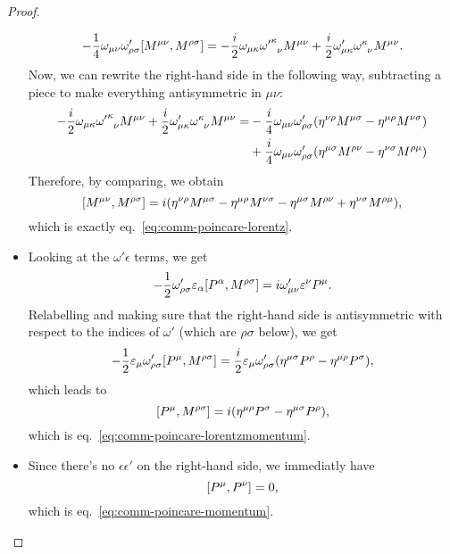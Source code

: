 \begin{mdframed}
\begin{proof}
\begin{itemize}
    \begin{align*}
       - \frac{1}{4} \omega_{\mu\nu} \omega'_{\rho\sigma} \comm{M^{\mu\nu}}{M^{\rho\sigma}} = -\frac{i}{2} \omega_{\mu\kappa} \tensor{{\omega'}}{^\kappa_\nu} M^{\mu\nu} + \frac{i}{2} \omega'_{\mu\kappa} \tensor{\omega}{^\kappa_\nu} M^{\mu\nu} .
    \end{align*}
    Now, we can rewrite the right-hand side in the following way, subtracting a piece to make everything antisymmetric in $\mu\nu$:
    \begin{align*}
        -\frac{i}{2} \omega_{\mu\kappa} \tensor{{\omega'}}{^\kappa_\nu} M^{\mu\nu} + \frac{i}{2} \omega'_{\mu\kappa} \tensor{\omega}{^\kappa_\nu} M^{\mu\nu} = &-\frac{i}{4} \omega_{\mu\nu} \omega'_{\rho\sigma}( \eta^{\nu\rho}M^{\mu\sigma} - \eta^{\mu\rho}M^{\nu\sigma} ) \\
        &+ \frac{i}{4} \omega_{\mu\nu}\omega'_{\rho\sigma} ( \eta^{\mu\sigma}M^{\rho\nu} -\eta^{\nu\sigma}M^{\rho\mu})
    \end{align*}
    Therefore, by comparing, we obtain
    \begin{equation*}
        \comm{M^{\mu\nu}}{M^{\rho\sigma}} = i ( \eta^{\nu\rho}M^{\mu\sigma} - \eta^{\mu\rho}M^{\nu\sigma} - \eta^{\mu\sigma}M^{\rho\nu} + \eta^{\nu\sigma}M^{\rho\mu}),
    \end{equation*}
    which is exactly eq.~\eqref{eq:comm-poincare-lorentz}.
    \item Looking at the $\omega' \epsilon$ terms, we get
    \begin{equation*}
         - \frac{1}{2} \omega'_{\rho\sigma} \epsilon_\alpha \comm{P^\alpha}{M^{\rho\sigma}} = i \omega'_{\mu\nu} \epsilon^\nu P^\mu .
    \end{equation*}
    Relabelling and making sure that the right-hand side is antisymmetric with respect to the indices of $\omega'$ (which are $\rho\sigma$ below), we get
    \begin{equation*}
        -\frac{1}{2} \epsilon_{\mu} \omega'_{\rho\sigma}\comm{P^\mu}{M^{\rho\sigma}} = \frac{i}{2} \epsilon_\mu \omega'_{\rho\sigma}  ( \eta^{\mu\sigma} P^\rho - \eta^{\mu\rho}P^{\sigma} ) ,
    \end{equation*}
    which leads to
    \begin{equation*}
        \comm{P^\mu}{M^{\rho\sigma}} = i (\eta^{\mu\rho} P^\sigma - \eta^{\mu\sigma} P^\rho),
    \end{equation*}
    which is eq.~\eqref{eq:comm-poincare-lorentzmomentum}.
    \item Since there's no $\epsilon \epsilon'$ on the right-hand side, we immediatly have
    \begin{equation*}
        \comm{P^\mu}{P^\nu} = 0,
    \end{equation*}
    which is eq.~\eqref{eq:comm-poincare-momentum}.
\end{itemize}
\end{proof}
\end{mdframed}


